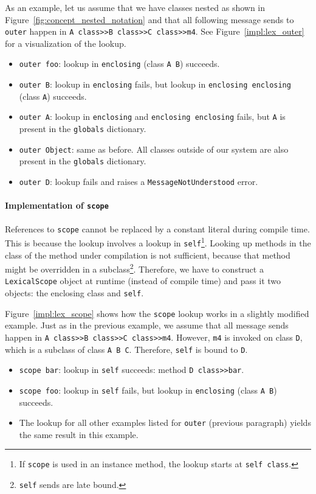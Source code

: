As an example, let us assume that we have classes nested as shown in Figure~\ref{fig:concept_nested_notation} and that all following message sends to \texttt{outer} happen in \texttt{A class>>B class>>C class>>m4}. See Figure~\ref{impl:lex_outer} for a visualization of the lookup.
\begin{itemize}
	\item \texttt{outer foo}: lookup in \texttt{enclosing} (class \texttt{A B}) succeeds.
	\item \texttt{outer B}: lookup in \texttt{enclosing} fails, but lookup in \texttt{enclosing enclosing} (class \texttt{A}) succeeds.
	\item \texttt{outer A}: lookup in \texttt{enclosing} and \texttt{enclosing enclosing} fails, but \texttt{A} is present in the \texttt{globals} dictionary.
	\item \texttt{outer Object}: same as before. All classes outside of our system are also present in the \texttt{globals} dictionary.
	\item \texttt{outer D}: lookup fails and raises a \texttt{MessageNotUnderstood} error.
\end{itemize}

\paragraph{Implementation of \texttt{scope}}
References to \texttt{scope} cannot be replaced by a constant literal during compile time. This is because the lookup involves a lookup in \texttt{self}\footnote{If \texttt{scope} is used in an instance method, the lookup starts at \texttt{self class}.}. Looking up methods in the class of the method under compilation is not sufficient, because that method might be overridden in a subclass\footnote{\texttt{self} sends are late bound.}. Therefore, we have to construct a \texttt{LexicalScope} object at runtime (instead of compile time) and pass it two objects: the enclosing class and \texttt{self}.

Figure~\ref{impl:lex_scope} shows how the \texttt{scope} lookup works in a slightly modified example. Just as in the previous example, we assume that all message sends happen in \texttt{A class>>B class>>C class>>m4}. However, \texttt{m4} is invoked on class \texttt{D}, which is a subclass of class \texttt{A B C}. Therefore, \texttt{self} is bound to \texttt{D}.

\begin{itemize}
	\item \texttt{scope bar}: lookup in \texttt{self} succeeds: method \texttt{D class>>bar}.
	\item \texttt{scope foo}: lookup in \texttt{self} fails, but lookup in \texttt{enclosing} (class \texttt{A B}) succeeds.
	\item The lookup for all other examples listed for \texttt{outer} (previous paragraph) yields the same result in this example.
\end{itemize}

